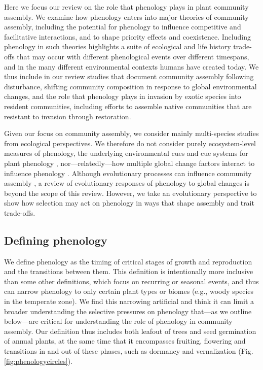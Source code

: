 \documentclass[11pt]{article}
\newcommand{\R}[1]{\label{}\linelabel{#1}}
\begin{document}
Here we focus our review on the role that phenology plays in plant community assembly. We examine how phenology enters into major theories of community assembly, including the potential for phenology to influence competitive and facilitative interactions, and to shape priority effects and coexistence. Including phenology in such theories highlights a suite of ecological and life history trade-offs that may occur with different phenological events over different timespans, and in the many different environmental contexts humans have created today. We thus include in our review studies that document community assembly following disturbance, shifting community composition in response to global environmental changes, and the role that phenology plays in invasion by exotic species into resident communities, including efforts to assemble native communities that are resistant to invasion through restoration. 

Given our focus on community assembly, we consider mainly multi-species studies from ecological perspectives. We therefore do not consider purely ecosystem-level measures of phenology, the underlying environmental cues and cue systems for plant phenology \citep[for a review see][]{chuine2017process}, nor---relatedly---how multiple global change factors interact to influence phenology \citep[e.g.][]{zhou2023climate}. Although evolutionary processes can influence community assembly \citep{cavender2019diversification}, a review of evolutionary responses of phenology to global changes is beyond the scope of this review. However, we take an evolutionary perspective to show how selection may act on phenology in ways that shape assembly and trait trade-offs.

\subsection*{Defining phenology} 

We define phenology as the timing of critical stages of growth and reproduction and the transitions between them. \R{defineS}This definition is intentionally more inclusive than some other definitions, which focus on recurring or seasonal events, and thus can narrow phenology to only certain plant types or biomes (e.g., woody species in the temperate zone). We find this narrowing artificial and think it can limit a broader understanding the selective pressures on phenology that---as we outline below---are critical for understanding the role of phenology in community assembly. Our definition thus includes both leafout of trees and seed germination of annual plants, at the same time that it encompasses fruiting, flowering and transitions in and out of these phases, such as dormancy and vernalization (Fig. \ref{fig:phenologycircles}).\R{defineE}
\end{document}

